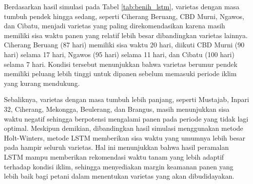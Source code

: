 Berdasarkan hasil simulasi pada Tabel \ref{tab:benih_lstm}, varietas dengan masa tumbuh pendek hingga sedang, seperti Ciherang Beruang, CBD Murni, Ngawos, dan Cibatu, menjadi varietas yang paling direkomendasikan karena masih memiliki sisa waktu panen yang relatif lebih besar dibandingkan varietas lainnya. Ciherang Beruang (87 hari) memiliki sisa waktu 20 hari, diikuti CBD Murni (90 hari) selama 17 hari, Ngawos (95 hari) selama 11 hari, dan Cibatu (100 hari) selama 7 hari. Kondisi tersebut menunjukkan bahwa varietas berumur pendek memiliki peluang lebih tinggi untuk dipanen sebelum memasuki periode iklim yang kurang mendukung.

Sebaliknya, varietas dengan masa tumbuh lebih panjang, seperti Mustajab, Inpari 32, Ciherang, Mekongga, Beulerang, dan Brangus, masih menunjukkan sisa waktu negatif sehingga berpotensi mengalami panen pada periode yang tidak lagi optimal. Meskipun demikian, dibandingkan hasil simulasi menggunakan metode Holt-Winters, metode LSTM memberikan sisa waktu yang umumnya lebih besar pada hampir seluruh varietas. Hal ini menunjukkan bahwa hasil peramalan LSTM mampu memberikan rekomendasi waktu tanam yang lebih adaptif terhadap kondisi iklim, sehingga menyediakan margin keamanan panen yang lebih baik bagi petani dalam menentukan varietas yang akan dibudidayakan.


